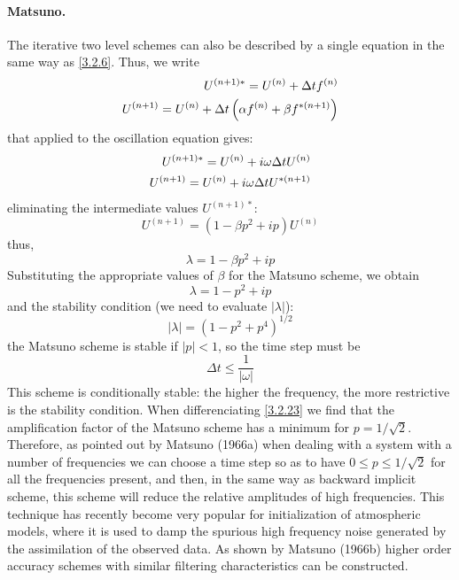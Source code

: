 \paragraph{Matsuno.}
The iterative two level schemes can also be described by a single equation in the same way as \ref{3.2.6}. Thus, we write
\begin{align}\label{3.2.18}
	U^{(n+1)*}=U^{(n)}+\Delta tf^{(n)}\notag \\
	U^{(n+1)}=U^{(n)}+\Delta t\left(\alpha f^{(n)}+\beta f^{*(n+1)}\right)
\end{align}
that applied to the oscillation equation gives:
\begin{align}
	U^{(n+1)*}=U^{(n)}+i\omega\Delta tU^{(n)} \notag \\
	U^{(n+1)}=U^{(n)}+i\omega\Delta tU^{*(n+1)}
\end{align}
eliminating the intermediate values $U^{(n+1)*}$:
$$U^{(n+1)}=\left(1-\beta p^2+ip\right)U^{(n)}$$
thus,
\begin{equation}\label{3.2.20}
	\lambda=1-\beta p^2+ip
\end{equation}
Substituting the appropriate values of $\beta$ for the Matsuno scheme, we obtain
\begin{equation}\label{3.2.21}
	\lambda=1-p^2+ip
\end{equation}
and the stability condition (we need to evaluate $|\lambda|$):
\begin{equation}\label{3.2.23}
	|\lambda|=\left(1-p^2+p^4\right)^{1/2}
\end{equation}
the Matsuno scheme is stable if $|p|<1$, so the time step must be $$\Delta t\leq\frac{1}{|\omega|}$$
This scheme is conditionally stable: the higher the frequency, the more restrictive is the stability condition. When differenciating \ref{3.2.23} we find that the amplification factor of the Matsuno scheme has a minimum for $p=1/\sqrt{2}$. Therefore, as pointed out by Matsuno (1966a) when dealing with a system with a number of frequencies we can choose a time step so as to have $0\leq p\leq 1/\sqrt{2}$ for all the frequencies present, and then, in the same way as backward implicit scheme, this scheme will reduce the relative amplitudes of high frequencies. This technique has recently become very popular for initialization of atmospheric models, where it is used to damp the spurious high frequency noise generated by the assimilation of the observed data. As shown by Matsuno (1966b) higher order accuracy schemes with similar filtering characteristics can be constructed.
